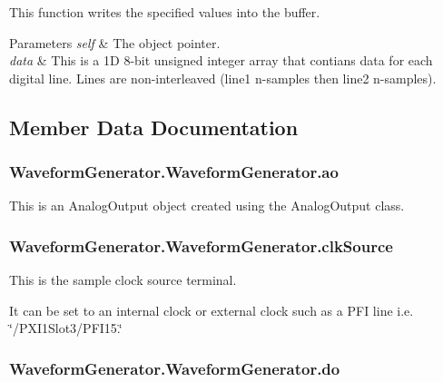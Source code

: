 This function writes the specified values into the buffer. 


\begin{DoxyParams}{Parameters}
{\em self} & The object pointer. \\
\hline
{\em data} & This is a 1\-D 8-\/bit unsigned integer array that contians data for each digital line. Lines are non-\/interleaved (line1 n-\/samples then line2 n-\/samples). \\
\hline
\end{DoxyParams}


\subsection{Member Data Documentation}
\hypertarget{class_waveform_generator_1_1_waveform_generator_ae7ee12ae23b6cf317da47e2580ea1655}{
\subsubsection[{ao}]{\setlength{\rightskip}{0pt plus 5cm}Waveform\-Generator.\-Waveform\-Generator.\-ao}}\label{class_waveform_generator_1_1_waveform_generator_ae7ee12ae23b6cf317da47e2580ea1655}


This is an Analog\-Output object created using the Analog\-Output class. 

\hypertarget{class_waveform_generator_1_1_waveform_generator_ae0573744cbc723202afa75c6381e3f71}{
\subsubsection[{clk\-Source}]{\setlength{\rightskip}{0pt plus 5cm}Waveform\-Generator.\-Waveform\-Generator.\-clk\-Source}}\label{class_waveform_generator_1_1_waveform_generator_ae0573744cbc723202afa75c6381e3f71}


This is the sample clock source terminal. 

It can be set to an internal clock or external clock such as a P\-F\-I line i.\-e. \char`\"{}/\-P\-X\-I1\-Slot3/\-P\-F\-I15.\char`\"{} \hypertarget{class_waveform_generator_1_1_waveform_generator_a923e4c005cdf1bc1cfdb1cbe33803f40}{
\subsubsection[{do}]{\setlength{\rightskip}{0pt plus 5cm}Waveform\-Generator.\-Waveform\-Generator.\-do}}\label{class_waveform_generator_1_1_waveform_generator_a923e4c005cdf1bc1cfdb1cbe33803f40}


